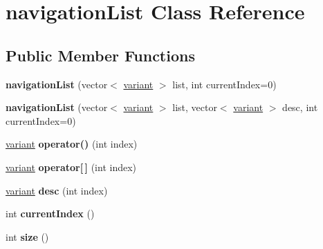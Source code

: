 \hypertarget{classnavigation_list}{}\section{navigation\+List Class Reference}
\label{classnavigation_list}
\subsection*{Public Member Functions}
\begin{DoxyCompactItemize}
\item 
\mbox{\label{classnavigation_list_ad27d660d90aad96df79b2c1d4e5131f4}} 
{\bfseries navigation\+List} (vector$<$ \hyperlink{classvariant}{variant} $>$ list, int current\+Index=0)
\item 
\mbox{\label{classnavigation_list_aa40d16b8f19f43142d9282d710622de6}} 
{\bfseries navigation\+List} (vector$<$ \hyperlink{classvariant}{variant} $>$ list, vector$<$ \hyperlink{classvariant}{variant} $>$ desc, int current\+Index=0)
\item 
\mbox{\label{classnavigation_list_af96cbbd9ad5c31241bb781f74e989c9f}} 
\hyperlink{classvariant}{variant} {\bfseries operator()} (int index)
\item 
\mbox{\label{classnavigation_list_acc3492f7401e40e16daa7f97179fbd19}} 
\hyperlink{classvariant}{variant} {\bfseries operator\mbox{[}$\,$\mbox{]}} (int index)
\item 
\mbox{\label{classnavigation_list_a62e3e8789e7e6a0d16a3e93db260167f}} 
\hyperlink{classvariant}{variant} {\bfseries desc} (int index)
\item 
\mbox{\label{classnavigation_list_a6173af348be751c16e5fafab0fd3191b}} 
int {\bfseries current\+Index} ()
\item 
\mbox{\label{classnavigation_list_a2e7f3dd5c43c274ef0c2bb042478d0f8}} 
int {\bfseries size} ()
\item 
\mbox{\label{classnavigation_list_a10c66278d7d7fa22f165c6dae6cad490}} 

\end{DoxyCompactItemize}

